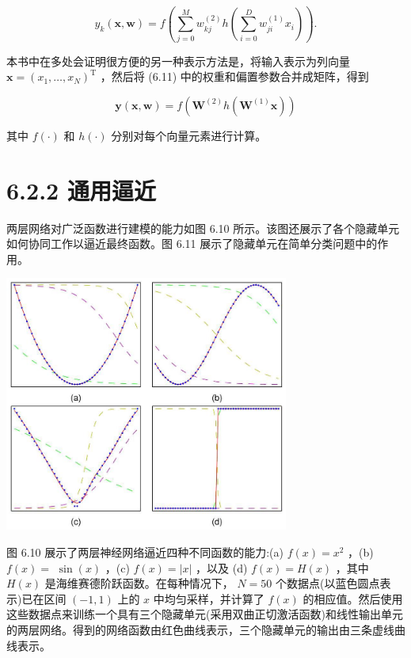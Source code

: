 \documentclass[10pt]{article}
\begin{document}
\[
{y}_{k}\left( {\mathbf{x},\mathbf{w}}\right)  = f\left( {\mathop{\sum }\limits_{{j = 0}}^{M}{w}_{kj}^{\left( 2\right) }h\left( {\mathop{\sum }\limits_{{i = 0}}^{D}{w}_{ji}^{\left( 1\right) }{x}_{i}}\right) }\right) . \tag{6.11}
\]

本书中在多处会证明很方便的另一种表示方法是，将输入表示为列向量 \(\mathbf{x} = {\left( {x}_{1},\ldots ,{x}_{N}\right) }^{\mathrm{T}}\) ，然后将 (6.11) 中的权重和偏置参数合并成矩阵，得到

\[
\mathbf{y}\left( {\mathbf{x},\mathbf{w}}\right)  = f\left( {{\mathbf{W}}^{\left( 2\right) }h\left( {{\mathbf{W}}^{\left( 1\right) }\mathbf{x}}\right) }\right)  \tag{6.12}
\]

其中 \(f\left( \cdot \right)\) 和 \(h\left( \cdot \right)\) 分别对每个向量元素进行计算。

\section*{6.2.2 通用逼近}

两层网络对广泛函数进行建模的能力如图 6.10 所示。该图还展示了各个隐藏单元如何协同工作以逼近最终函数。图 6.11 展示了隐藏单元在简单分类问题中的作用。

\begin{center}
\includegraphics[max width=0.7\textwidth]{images/0194e279-9b28-703a-88f4-c3ac21e2010d_201_658_352_873_787_0.jpg}
\end{center}
\hspace*{3em} 

图 6.10 展示了两层神经网络逼近四种不同函数的能力:(a) \(f\left( x\right)  = {x}^{2}\) ，(b) \(f\left( x\right)  =\)  \(\sin \left( x\right)\) ，(c) \(f\left( x\right)  = \left| x\right|\) ，以及 (d) \(f\left( x\right)  = H\left( x\right)\) ，其中 \(H\left( x\right)\) 是海维赛德阶跃函数。在每种情况下， \(N = {50}\) 个数据点(以蓝色圆点表示)已在区间 \(\left( {-1,1}\right)\) 上的 \(x\) 中均匀采样，并计算了 \(f\left( x\right)\) 的相应值。然后使用这些数据点来训练一个具有三个隐藏单元(采用双曲正切激活函数)和线性输出单元的两层网络。得到的网络函数由红色曲线表示，三个隐藏单元的输出由三条虚线曲线表示。
\end{document}
